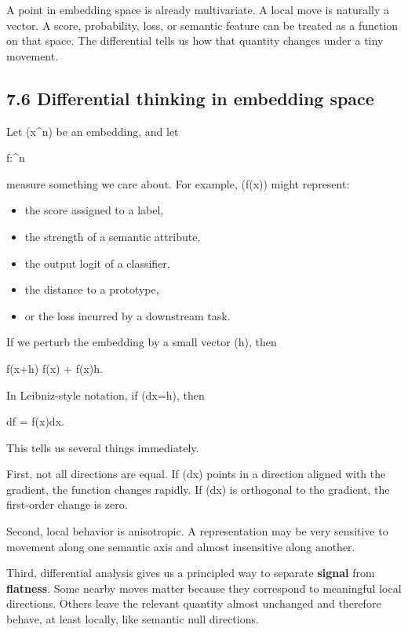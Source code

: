\documentclass[
]{article}
\providecommand{\tightlist}{%
  \setlength{\itemsep}{0pt}\setlength{\parskip}{0pt}}
\begin{document}
A point in embedding space is already multivariate. A local move is
naturally a vector. A score, probability, loss, or semantic feature can
be treated as a function on that space. The differential tells us how
that quantity changes under a tiny movement.

\hypertarget{differential-thinking-in-embedding-space}{%
\subsection{7.6 Differential thinking in embedding
space}\label{differential-thinking-in-embedding-space}}

Let (x\in{}\^{}n) be an embedding, and let

f:\^{}n\to{}

measure something we care about. For example, (f(x)) might represent:

\begin{itemize}
\tightlist
\item
  the score assigned to a label,
\item
  the strength of a semantic attribute,
\item
  the output logit of a classifier,
\item
  the distance to a prototype,
\item
  or the loss incurred by a downstream task.
\end{itemize}

If we perturb the embedding by a small vector (h), then

f(x+h) \approx f(x) + \nabla f(x)\cdot h.

In Leibniz-style notation, if (dx=h), then

df = \nabla f(x)\cdot dx.

This tells us several things immediately.

First, not all directions are equal. If (dx) points in a direction
aligned with the gradient, the function changes rapidly. If (dx) is
orthogonal to the gradient, the first-order change is zero.

Second, local behavior is anisotropic. A representation may be very
sensitive to movement along one semantic axis and almost insensitive
along another.

Third, differential analysis gives us a principled way to separate
\textbf{signal} from \textbf{flatness}. Some nearby moves matter because
they correspond to meaningful local directions. Others leave the
relevant quantity almost unchanged and therefore behave, at least
locally, like semantic null directions.
\end{document}

